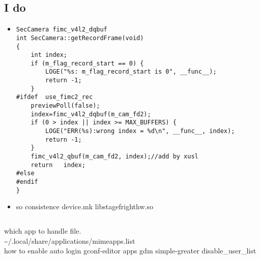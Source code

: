 \documentclass[a4paper,10pt,twoside]{article}%
\begin{document}
\subsection{I do}
\begin{itemize}
    \item
\begin{lstlisting}
SecCamera fimc_v4l2_dqbuf
int SecCamera::getRecordFrame(void)
{
    int index;
    if (m_flag_record_start == 0) {
        LOGE("%s: m_flag_record_start is 0", __func__);
        return -1;
    }
#ifdef  use_fimc2_rec	
    previewPoll(false);
    index=fimc_v4l2_dqbuf(m_cam_fd2);
    if (0 > index || index >= MAX_BUFFERS) {
        LOGE("ERR(%s):wrong index = %d\n", __func__, index);
        return -1;
    }
    fimc_v4l2_qbuf(m_cam_fd2, index);//add by xusl
    return   index;
#else
#endif
}
\end{lstlisting}
\item so consistence device.mk libstagefrighthw.so 
    \end{itemize}

% 
\begin{verbatim}

\end{verbatim}

which app to handle file.\\\indent\~{}/.local/share/applications/mimeapps.list  \\
how to enable auto login gconf-editor apps gdm simple-greater disable\_user\_list
\newpage
\end{document}
